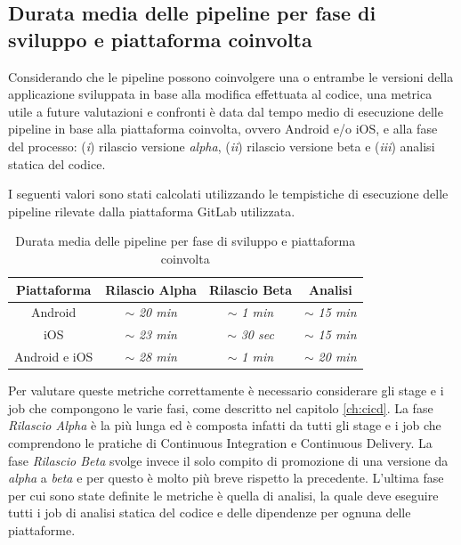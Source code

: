 \subsection*{Durata media delle pipeline per fase di sviluppo e piattaforma coinvolta}
Considerando che le pipeline possono coinvolgere una o entrambe le versioni della applicazione sviluppata in base alla modifica effettuata al codice, una metrica utile a future valutazioni e confronti è data dal tempo medio di esecuzione delle pipeline in base alla piattaforma coinvolta, ovvero Android e/o iOS, e alla fase del processo: (\textit{i}) rilascio versione \textit{alpha}, (\textit{ii}) rilascio versione beta e (\textit{iii}) analisi statica del codice.

I seguenti valori sono stati calcolati utilizzando le tempistiche di esecuzione delle pipeline rilevate dalla piattaforma GitLab utilizzata.

\begin{table}[H]
\centering
    \begin{tabular}{|c|c|c|c|}
         \hline
         \textbf{Piattaforma} & \textbf{Rilascio Alpha} & \textbf{Rilascio Beta} & \textbf{Analisi}\\
         \hline
         Android & $\sim$ \textit{20 min} & $\sim$ \textit{1 min} & $\sim$ \textit{15 min} \\
         \hline
         iOS & $\sim$ \textit{23 min} & $\sim$ \textit{30 sec} & $\sim$ \textit{15 min} \\
         \hline
         Android e iOS & $\sim$ \textit{28 min} & $\sim$ \textit{1 min} & $\sim$ \textit{20 min} \\
         \hline
    \end{tabular}
    \caption{Durata media delle pipeline per fase di sviluppo e piattaforma coinvolta}
\end{table}

Per valutare queste metriche correttamente è necessario considerare gli stage e i job che compongono le varie fasi, come descritto nel capitolo \ref{ch:cicd}. La fase \textit{Rilascio Alpha} è la più lunga ed è composta infatti da tutti gli stage e i job che comprendono le pratiche di Continuous Integration e Continuous Delivery. La fase \textit{Rilascio Beta} svolge invece il solo compito di promozione di una versione da \textit{alpha} a \textit{beta} e per questo è molto più breve rispetto la precedente. L'ultima fase per cui sono state definite le metriche è quella di analisi, la quale deve eseguire tutti i job di analisi statica del codice e delle dipendenze per ognuna delle piattaforme.

